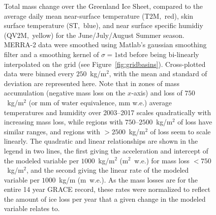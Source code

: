\documentclass[11pt]{report}
\begin{document}
 \begin{figure}[h]
\centering
{}
\caption[Comparison of Total Mass Loss with T2M, ST, QV2M: 2003--2012]{Total mass change over the Greenland Ice Sheet, compared to the average daily mean near-surface temperature (T2M,~red), skin surface temperature (ST,~blue), and near surface specific humidiy (QV2M,~yellow) for the June/July/August Summer season. MERRA-2 data were smoothed using Matlab's gaussian smoothing filter and a smoothing kernel of $\sigma=1\mathrm{std}$ before being bi-linearly interpolated on the grid (see Figure~\ref{fig:gridbasins}). Cross-plotted data were binned every $250$~kg/m$^2$, with the mean and standard of deviation are represented here. Note that in zones of mass accumulation (negative mass loss on the $x$-axis) and loss of $750$~kg/m$^2$ (or mm of water equivalence, mm w.e.) average temperatures and humidity over 2003--2017 scales quadratically with increasing mass loss, while regions with $750$--$2500$~kg/m$^2$ of loss have similar ranges, and regions with $>2500$~kg/m$^2$ of loss seem to scale linearly. The quadratic and linear relationships are shown in the legend in two lines, the first giving the acceleration and intercept of the modeled variable per $1000$~kg/m$^2$ (m$^2$~w.e.) for mass loss $<750$~kg/m$^2$, and the second giving the linear rate of the modeled variable per $1000$~kg/m (m~w.e.). As the mass losses are for the entire 14 year GRACE record, these rates were normalized to reflect the amount of ice loss per year that a given change in the modeled variable relates to.
\label{fig:comparisontotal}}
\end{figure}


 \begin{figure}[h]
\centering
{}
\caption[Comparison of Regional Mass Loss with T2M: 2003--2012]{} \label{fig:comparisontotal}
\end{figure}
\end{document}
